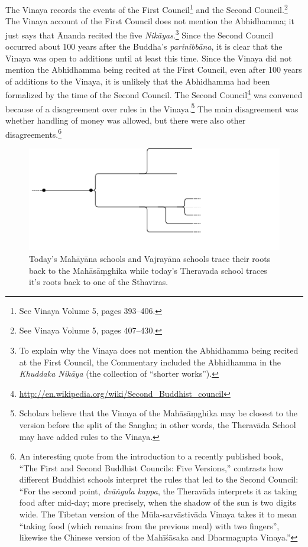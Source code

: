 The Vinaya records the events of the First Council\footnote{See Vinaya Volume 5, pages 393--406.} and the Second Council.\footnote{See Vinaya Volume 5, pages 407--430.} The Vinaya account of the First Council does not mention the Abhidhamma; it just says that Ānanda recited the five \textit{Nikāyas}.\footnote{To explain why the Vinaya does not mention the Abhidhamma being recited at the First Council, the Commentary included the Abhidhamma in the \textit{Khuddaka Nikāya} (the collection of “shorter works”).} Since the Second Council occurred about 100 years after the Buddha’s \textit{parinibbāna}, it is clear that the Vinaya was open to additions until at least this time. Since the Vinaya did not mention the Abhidhamma being recited at the First Council, even after 100 years of additions to the Vinaya, it is unlikely that the Abhidhamma had been formalized by the time of the Second Council. The Second Council\footnote{\url{http://en.wikipedia.org/wiki/Second_Buddhist_council}} was convened because of a disagreement over rules in the Vinaya.\footnote{Scholars believe that the Vinaya of the Mahāsāṃghika may be closest to the version before the split of the Sangha; in other words, the Theravāda School may have added rules to the Vinaya.} The main disagreement was whether handling of money was allowed, but there were also other disagreements.\footnote{An interesting quote from the introduction to a recently published book, “The First and Second Buddhist Councils: Five Versions,” contrasts how different Buddhist schools interpret the rules that led to the Second Council: “For the second point, \textit{dvāṅgula kappa}, the Theravāda interprets it as taking food after mid-day; more precisely, when the shadow of the sun is two digits wide. The Tibetan version of the Mūla-sarvāstivāda Vinaya takes it to mean “taking food (which remains from the previous meal) with two fingers”, likewise the Chinese version of the Mahīśāsaka and Dharmagupta Vinaya.”}

\pagebreak

\begin{figure}[h]
\centering
\includegraphics[width=1\linewidth]{./Diagrams/Schools}
\caption{Today’s Mahāyāna schools and Vajrayāna schools trace their roots back to the Mahāsāṃghika while today’s Theravada school traces it’s roots back to one of the Sthaviras.}
\label{fig:Schools}
\end{figure}

